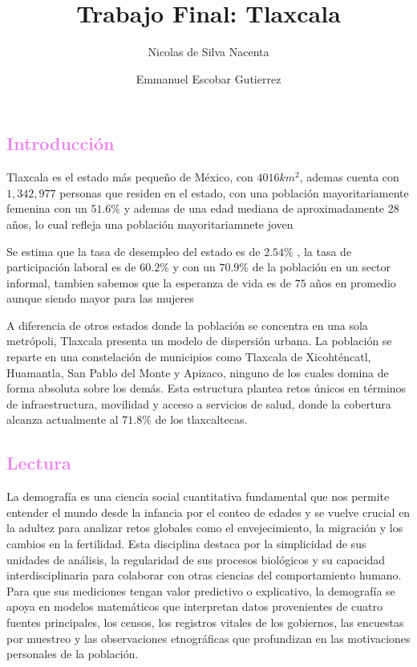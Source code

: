 \documentclass[
  letterpaper,
  DIV=11,
  numbers=noendperiod]{scrartcl}
\title{Trabajo Final: Tlaxcala}
\author{Nicolas de Silva Nacenta \and Emmanuel Escobar Gutierrez}
\date{}
\begin{document}
\maketitle


\subsection{\texorpdfstring{\textcolor{violet}{Introducción}}{}}\label{section}

Tlaxcala es el estado más pequeño de México, con \(4016km^2\), ademas
cuenta con \(1,342,977\) personas que residen en el estado, con una
población mayoritariamente femenina con un \(51.6\%\) y ademas de una
edad mediana de aproximadamente \(28\) años, lo cual refleja una
población mayoritariamnete joven

Se estima que la tasa de desempleo del estado es de \(2.54\%\) , la tasa
de participación laboral es de \(60.2\%\) y con un \(70.9\%\) de la
población en un sector informal, tambien sabemos que la esperanza de
vida es de \(75\) años en promedio aunque siendo mayor para las mujeres

A diferencia de otros estados donde la población se concentra en una
sola metrópoli, Tlaxcala presenta un modelo de dispersión urbana. La
población se reparte en una constelación de municipios como Tlaxcala de
Xicohténcatl, Huamantla, San Pablo del Monte y Apizaco, ninguno de los
cuales domina de forma absoluta sobre los demás. Esta estructura plantea
retos únicos en términos de infraestructura, movilidad y acceso a
servicios de salud, donde la cobertura alcanza actualmente al \(71.8\%\)
de los tlaxcaltecas.

\subsection{\texorpdfstring{\textcolor{violet}{Lectura}}{}}\label{section-1}

La demografía es una ciencia social cuantitativa fundamental que nos
permite entender el mundo desde la infancia por el conteo de edades y se
vuelve crucial en la adultez para analizar retos globales como el
envejecimiento, la migración y los cambios en la fertilidad. Esta
disciplina destaca por la simplicidad de sus unidades de análisis, la
regularidad de sus procesos biológicos y su capacidad interdisciplinaria
para colaborar con otras ciencias del comportamiento humano. Para que
sus mediciones tengan valor predictivo o explicativo, la demografía se
apoya en modelos matemáticos que interpretan datos provenientes de
cuatro fuentes principales, los censos, los registros vitales de los
gobiernos, las encuestas por muestreo y las observaciones etnográficas
que profundizan en las motivaciones personales de la población.
\end{document}
